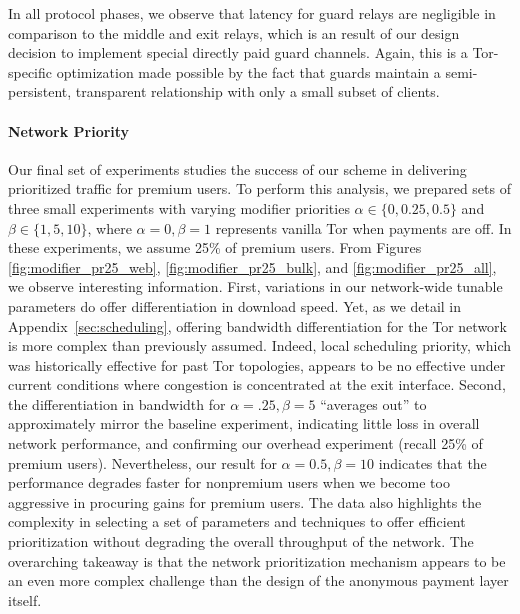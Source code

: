 In all protocol phases, we observe that latency for guard relays are negligible
in comparison to the middle and exit relays, which is an result of our design
decision to implement special directly paid guard channels. Again, this is a
Tor-specific optimization made possible by the fact that guards maintain a
semi-persistent, transparent relationship with only a small subset of clients.

\paragraph*{Network Priority}
\label{sec:priority_exp}
Our final set of experiments studies the success of our scheme in delivering
prioritized traffic for premium users. To perform this analysis, we prepared
sets of three small experiments with varying modifier priorities $\alpha \in
\{0, 0.25, 0.5\}$ and $\beta \in \{1, 5, 10\}$, where $\alpha = 0, \beta = 1$
represents vanilla Tor when payments are off. In these experiments, we assume
25\% of premium users. From Figures \ref{fig:modifier_pr25_web},
\ref{fig:modifier_pr25_bulk}, and \ref{fig:modifier_pr25_all}, we observe
interesting information. First, variations in our network-wide tunable
parameters do offer differentiation in download speed. Yet, as we detail in
Appendix~\ref{sec:scheduling}, offering bandwidth differentiation for the Tor
network is more complex than previously assumed. Indeed, local scheduling
priority, which was historically effective for past Tor topologies, appears to
be no effective under current conditions where congestion is concentrated at
the exit interface. Second, the differentiation in bandwidth for $\alpha = .25,
\beta=5$ ``averages out'' to approximately mirror the baseline experiment,
indicating little loss in overall network performance, and confirming our
overhead experiment (recall 25\% of premium users). Nevertheless, our result for
$\alpha = 0.5, \beta=10$ indicates that the performance degrades faster for
nonpremium users when we become too aggressive in procuring gains for
premium users. The data also highlights the complexity in selecting a set of
parameters and techniques to offer efficient prioritization without degrading
the overall throughput of the network. The overarching takeaway is that the
network prioritization mechanism appears to be an even more complex challenge
than the design of the anonymous payment layer itself.


